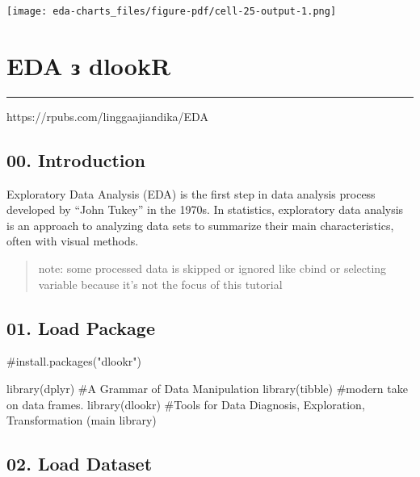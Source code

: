 \documentclass[
  letterpaper,
  DIV=11,
  numbers=noendperiod]{scrreprt}
\newenvironment{Shaded}{\begin{snugshade}}{\end{snugshade}}
\newcommand{\CommentTok}[1]{\textcolor[rgb]{0.37,0.37,0.37}{#1}}
\newcommand{\FunctionTok}[1]{\textcolor[rgb]{0.28,0.35,0.67}{#1}}
\newcommand{\NormalTok}[1]{\textcolor[rgb]{0.00,0.23,0.31}{#1}}
\begin{document}
\texttt{[image: eda-charts\_files/figure-pdf/cell-25-output-1.png]}

\chapter{EDA з dlookR}\label{eda-ux437-dlookr}

\begin{center}\rule{0.5\linewidth}{0.5pt}\end{center}

https://rpubs.com/linggaajiandika/EDA

\section{00. Introduction}\label{introduction}

Exploratory Data Analysis (EDA) is the first step in data analysis
process developed by ``John Tukey'' in the 1970s. In statistics,
exploratory data analysis is an approach to analyzing data sets to
summarize their main characteristics, often with visual methods.

\begin{quote}
note: some processed data is skipped or ignored like cbind or selecting
variable because it's not the focus of this tutorial
\end{quote}

\section{01. Load Package}\label{load-package}

\begin{Shaded}
\begin{Highlighting}[]
\CommentTok{\#install.packages("dlookr")}
\end{Highlighting}
\end{Shaded}

\begin{Shaded}
\begin{Highlighting}[]
\FunctionTok{library}\NormalTok{(dplyr) }\CommentTok{\#A Grammar of Data Manipulation}
\FunctionTok{library}\NormalTok{(tibble) }\CommentTok{\#modern take on data frames.}
\FunctionTok{library}\NormalTok{(dlookr) }\CommentTok{\#Tools for Data Diagnosis, Exploration, Transformation (main library)}
\end{Highlighting}
\end{Shaded}

\section{02. Load Dataset}\label{load-dataset}
\end{document}
